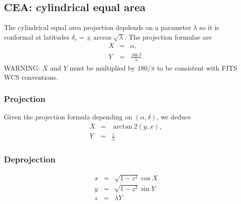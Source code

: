 \subsection{CEA: cylindrical equal area}

  The cylindrical equal area projection depdends on a parameter $\lambda$
  so it is conformal at latitudes $\delta_c = \pm \arccos\sqrt{\lambda}$.
  The projection formulae are
  \begin{eqnarray}
    X & = & \alpha, \\
    Y & = & \frac{\sin\delta}{\lambda}.
  \end{eqnarray}
  WARNING: $X$ and $Y$ must be multiplied by $180/\pi$ to be consistent
  with FITS WCS conventions.

  \subsubsection{Projection}
    
    Given the projection formula depending on $(\alpha, \delta)$, we deduce
    \begin{eqnarray}
      X & = & \arctan 2(y, x), \\
      Y & = & \frac{z}{\lambda}
    \end{eqnarray}

  \subsubsection{Deprojection}

    \begin{eqnarray}
      x & = & \sqrt{1 - z^2}\cos X \\
      y & = & \sqrt{1 - z^2}\sin Y \\
      z & = & \lambda Y
    \end{eqnarray} 


